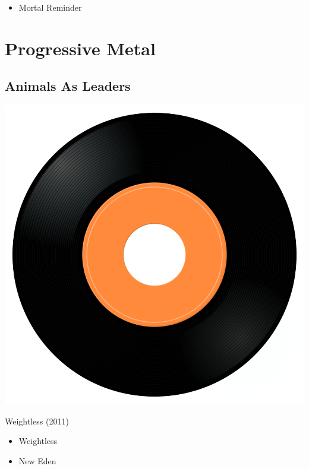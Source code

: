 \begin{minipage}[t]{0.25\textwidth}\vspace{0pt}
\begin{itemize}[nosep,leftmargin=1em,labelwidth=*,align=left]
	\setlength{\itemsep}{0pt}
	\item Mortal Reminder
\end{itemize}
\end{minipage}


\section{Progressive Metal}

\subsection{Animals As Leaders}

\begin{minipage}[t]{0.25\textwidth}
\captionsetup{type=figure}
\includegraphics[width=\textwidth]{Images/cover.png}
\caption*{Weightless (2011)}
\end{minipage}
\begin{minipage}[t]{0.25\textwidth}\vspace{0pt}
\begin{itemize}[nosep,leftmargin=1em,labelwidth=*,align=left]
	\setlength{\itemsep}{0pt}
	\item Weightless
	\item New Eden
\end{itemize}
\end{minipage}

